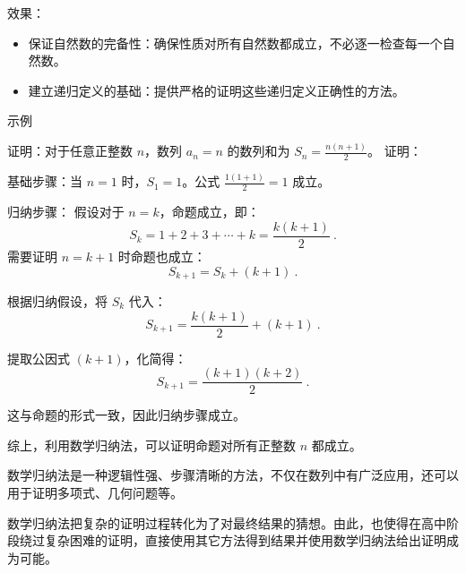 效果：
\begin{itemize}
\item 保证自然数的完备性：确保性质对所有自然数都成立，不必逐一检查每一个自然数。
\item 建立递归定义的基础：提供严格的证明这些递归定义正确性的方法。
\end{itemize}


示例
\begin{example}{证明：对于任意正整数 $n$，数列 $a_n=n$ 的数列和为 $S_n = \frac{n(n+1)}{2}$。}
证明：

基础步骤：当 $n = 1$ 时，$S_1 = 1$。公式 $\frac{1(1+1)}{2} = 1$ 成立。

归纳步骤：
假设对于 $n = k$，命题成立，即：
\begin{equation}
S_k = 1 + 2 + 3 + \cdots + k = \frac{k(k+1)}{2}~.
\end{equation}
需要证明 $n = k+1$ 时命题也成立：
\begin{equation}
S_{k+1} = S_k + (k+1)~.
\end{equation}

根据归纳假设，将 $S_k$ 代入：
\begin{equation}
S_{k+1} = \frac{k(k+1)}{2} + (k+1)~.
\end{equation}

提取公因式 $(k+1)$，化简得：
\begin{equation}
S_{k+1} = \frac{(k+1)(k+2)}{2}~.
\end{equation}

这与命题的形式一致，因此归纳步骤成立。

综上，利用数学归纳法，可以证明命题对所有正整数 $n$ 都成立。
\end{example}

数学归纳法是一种逻辑性强、步骤清晰的方法，不仅在数列中有广泛应用，还可以用于证明多项式、几何问题等。

数学归纳法把复杂的证明过程转化为了对最终结果的猜想。由此，也使得在高中阶段绕过复杂困难的证明，直接使用其它方法得到结果并使用数学归纳法给出证明成为可能。